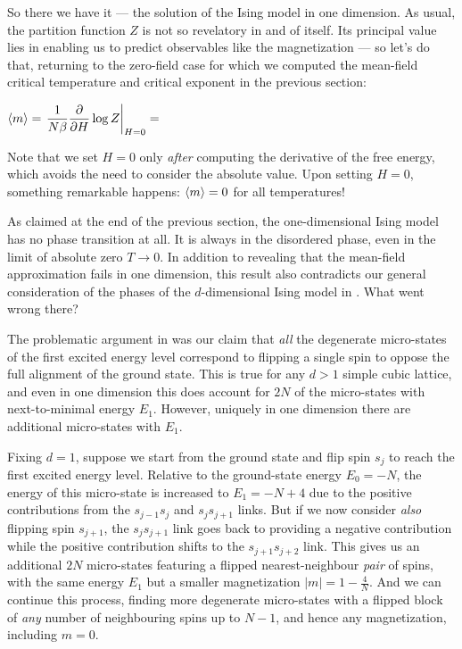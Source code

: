 So there we have it --- the solution of the Ising model in one dimension.
As usual, the partition function $Z$ is not so revelatory in and of itself.
Its principal value lies in enabling us to predict observables like the magnetization --- so let's do that, returning to the zero-field case for which we computed the mean-field critical temperature and critical exponent in the previous section:
\begin{mdframed}
  $\displaystyle \left\langle m \right\rangle = \left. \frac{1}{N\beta} \frac{\partial }{\partial H}\log Z \right|_{H = 0} = $ \\[80 pt]
\end{mdframed}
Note that we set $H = 0$ only \textit{after} computing the derivative of the free energy, which avoids the need to consider the absolute value.
Upon setting $H = 0$, something remarkable happens: $\left\langle m \right\rangle = 0$ for all temperatures!

As claimed at the end of the previous section, the one-dimensional Ising model has no phase transition at all.
It is always in the disordered phase, even in the limit of absolute zero $T \to 0$.
In addition to revealing that the mean-field approximation fails in one dimension, this result also contradicts our general consideration of the phases of the $d$-dimensional Ising model in .
What went wrong there?

The problematic argument in  was our claim that \textit{all} the degenerate micro-states of the first excited energy level correspond to flipping a single spin to oppose the full alignment of the ground state.
This is true for any $d > 1$ simple cubic lattice, and even in one dimension this does account for $2N$ of the micro-states with next-to-minimal energy $E_1$.
However, uniquely in one dimension there are additional micro-states with $E_1$.

Fixing $d = 1$, suppose we start from the ground state and flip spin $s_j$ to reach the first excited energy level.
Relative to the ground-state energy $E_0 = -N$, the energy of this micro-state is increased to $E_1 = -N + 4$ due to the positive contributions from the $s_{j - 1} s_j$ and $s_j s_{j + 1}$ links.
But if we now consider \textit{also} flipping spin $s_{j + 1}$, the $s_j s_{j + 1}$ link goes back to providing a negative contribution while the positive contribution shifts to the $s_{j + 1} s_{j + 2}$ link.
This gives us an additional $2N$ micro-states featuring a flipped nearest-neighbour \textit{pair} of spins, with the same energy $E_1$ but a smaller magnetization $|m| = 1 - \frac{4}{N}$.
And we can continue this process, finding more degenerate micro-states with a flipped block of \textit{any} number of neighbouring spins up to $N - 1$, and hence any magnetization, including $m = 0$.

